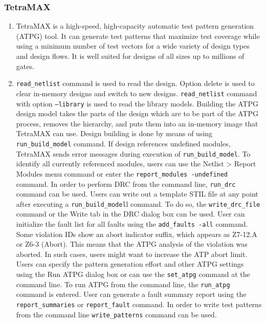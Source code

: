 \documentclass[a4paper,12pt,twoside]{article}
\begin{document}
\subsubsection{TetraMAX}
\begin{enumerate}
    \item TetraMAX is a high-speed, high-capacity automatic test pattern generation (ATPG) tool. It can generate test patterns that maximize test coverage while using a minimum number of test vectors for a wide variety of design types and design flows. It is well suited for designs of all sizes up to millions of gates.
    \item \texttt{read\_netlist} command is used to read the design. Option delete is used to clear in-memory designs and switch to new designs. \texttt{read\_netlist} command with option \texttt{–library} is used to read the library models. Building the ATPG design model takes the parts of the design which are to be part of the ATPG process, removes the hierarchy, and puts them into an in-memory image that TetraMAX can use. Design building is done by means of using \texttt{run\_build\_model} command. If design references undefined modules, TetraMAX sends error messages during execution of \texttt{run\_build\_model}. To identify all currently referenced modules, users can use the Netlist > Report Modules menu command or enter the \texttt{report\_modules -undefined} command. In order to perform DRC from the command line, \texttt{run\_drc} command can be used. Users can write out a template STIL file at any point after executing a \texttt{run\_build\_model}l command. To do so, the \texttt{write\_drc\_file} command or the Write tab in the DRC dialog box can be used. User can initialize the fault list for all faults using the \texttt{add\_faults -all} command. Some violation IDs show an abort indicator suffix, which appears as Z7-12.A or Z6-3 (Abort). This means that the ATPG analysis of the violation was aborted. In such cases, users might want to increase the ATP abort limit. Users can specify the pattern generation effort and other ATPG settings using the Run ATPG dialog box or can use the \texttt{set\_atpg} command at the command line. To run ATPG from the command line, the \texttt{run\_atpg} command is entered. User can generate a fault summary report using the \texttt{report\_summaries} or \texttt{report\_fault} command. In order to write test patterns from the command line \texttt{write\_patterns} command can be used.
\end{enumerate}
\end{document}
